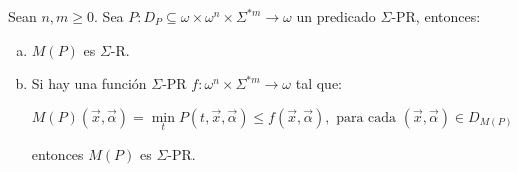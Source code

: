   \begin{lemma}
    \par Sean $n, m \geq 0$. Sea $P: D_{P} \subseteq \omega \times \omega^{n} \times \Sigma^{\ast m} \rightarrow \omega$
    un predicado $\Sigma$-PR, entonces:

    \begin{enumerate}[a)]
      \item $M(P)$ es $\Sigma$-R.
      \item Si hay una función $\Sigma$-PR $f: \omega^{n} \times \Sigma^{\ast m} \rightarrow \omega$ tal que:

        \[
          M(P)(\vec{x},\vec{\alpha}) = \min_{t}P(t,\vec{x},\vec{\alpha}) \leq f(\vec{x},\vec{\alpha}),
          \text{ para cada }(\vec{x},\vec{\alpha}) \in D_{M(P)}
        \]

        \par entonces $M(P)$ es $\Sigma$-PR.
    \end{enumerate}
  \end{lemma}
